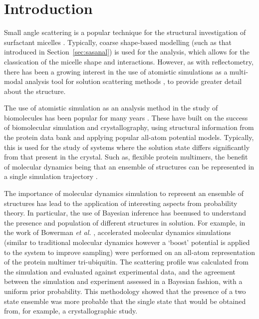 \section{Introduction}

Small angle scattering is a popular technique for the structural investigation of surfactant micelles \cite{sanchez-fernandez_micellization_2016}.
Typically, coarse shape-based modelling (such as that introduced in Section~\ref{sec:sasanal}) is used for the analysis, which allows for the classication of the micelle shape and interactions.
However, as with reflectometry, there has been a growing interest in the use of atomistic simulations as a multi-modal analysis tool for solution scattering methods \cite{ivanovic_temperature-dependent_2018}, to provide greater detail about the structure.

The use of atomistic simulation as an analysis method in the study of biomolecules has been popular for many years \cite{perkins_solution_1991,mayans_demonstration_1995,hub_interpreting_2018}.
These have built on the success of biomolecular simulation and crystallography, using structural information from the protein data bank \cite{noauthor_rcsb_nodate} and applying popular all-atom potential models.
Typically, this is used for the study of systems where the solution state differs significantly from that present in the crystal.
Such as, flexible protein multimers, the benefit of molecular dynamics being that an ensemble of structures can be represented in a single simulation trajectory \cite{chen_validating_2014,bowerman_determining_2017}.

The importance of molecular dynamics simulation to represent an ensemble of structures has lead to the application of interesting aspects from probability theory.
In particular, the use of Bayesian inference has beenused to understand the presence and population of different structures in solution.
For example, in the work of Bowerman \emph{et al.} \cite{bowerman_determining_2017}, accelerated molecular dynamics simulations (similar to traditional molecular dynamics however a `boost' potential is applied to the system to improve sampling) were performed on an all-atom representation of the protein multimer tri-ubiquitin.
The scattering profile was calculated from the simulation and evaluated against experimental data, and the agreement between the simulation and experiment assessed in a Bayesian fashion, with a uniform prior probability.
This methodology showed that the presence of a two state ensemble was more probable that the single state that would be obtained from, for example, a crystallographic study.

